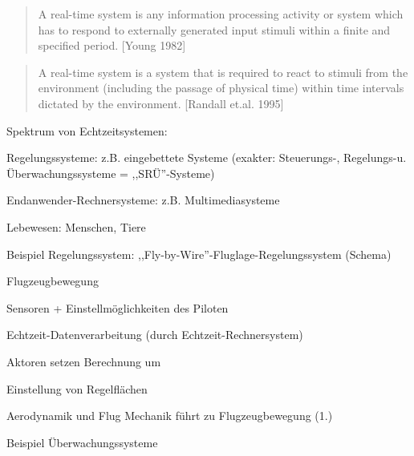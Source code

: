 \documentclass[a4paper]{article}
\begin{document}
\begin{multicols}{3}
    \begin{quote}
        A real-time system is any information processing activity or system
        which has to respond to externally generated input stimuli within a
        finite and specified period. {[}Young 1982{]}
    \end{quote}

    \begin{quote}
        A real-time system is a system that is required to react to stimuli from
        the environment (including the passage of physical time) within time
        intervals dictated by the environment. {[}Randall et.al. 1995{]}
    \end{quote}

    Spektrum von Echtzeitsystemen:

    \begin{enumerate*}
        \item
        Regelungssysteme: z.B. eingebettete Systeme (exakter: Steuerungs-,
        Regelungs-u. Überwachungssysteme = ,,SRÜ''-Systeme)
        \item
        Endanwender-Rechnersysteme: z.B. Multimediasysteme
        \item
        Lebewesen: Menschen, Tiere
    \end{enumerate*}

    Beispiel Regelungssystem: ,,Fly-by-Wire''-Fluglage-Regelungssystem
    (Schema)

    \begin{enumerate*}
        \item
        Flugzeugbewegung
        \item
        Sensoren + Einstellmöglichkeiten des Piloten
        \item
        Echtzeit-Datenverarbeitung (durch Echtzeit-Rechnersystem)
        \item
        Aktoren setzen Berechnung um
        \item
        Einstellung von Regelflächen
        \item
        Aerodynamik und Flug Mechanik führt zu Flugzeugbewegung (1.)
    \end{enumerate*}

    Beispiel Überwachungssysteme


\end{multicols}
\end{document}
